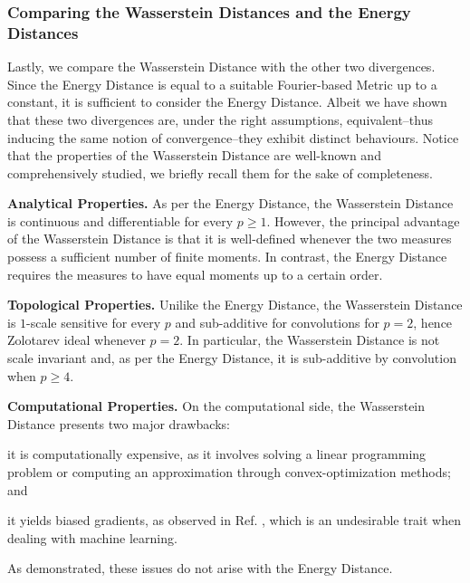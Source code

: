 \documentclass{article}
\renewcommand{\ge}{\geqslant}
\begin{document}


\subsubsection{Comparing the Wasserstein Distances and the Energy Distances}

Lastly, we compare the Wasserstein Distance with the other two divergences.
% 
Since the Energy Distance is equal to a suitable Fourier-based Metric up to a constant, it is sufficient to consider the Energy Distance.
% 
Albeit we have shown that these two divergences are, under the right assumptions, equivalent--thus inducing the same notion of convergence--they exhibit distinct behaviours.
% 
Notice that the properties of the Wasserstein Distance are well-known and comprehensively studied\cite{ambrosio2005gradient,santambrogio2015optimal,villani2009optimal}, we briefly recall them for the sake of completeness.

% 
{\textbf{Analytical Properties.}}
% 
As per the Energy Distance, the Wasserstein Distance is continuous and differentiable for every $p\ge 1$.
% 
However, the principal advantage of the Wasserstein Distance is that it is well-defined whenever the two measures possess a sufficient number of finite moments. 
% 
In contrast, the Energy Distance requires the measures to have equal moments up to a certain order.
% 
% 

% 

% 
{\textbf{Topological Properties.}}
% 
Unilike the Energy Distance, the Wasserstein Distance is $1$-scale sensitive for every $p$ and sub-additive for convolutions for $p=2$, hence Zolotarev ideal whenever $p=2$.\cite{CaTo}
% 
In particular, the Wasserstein Distance is not scale invariant and, as per the Energy Distance, it is sub-additive by convolution when $p\ge 4$.
% 
% 


{\textbf{Computational Properties.}}
On the computational side, the Wasserstein Distance presents two major drawbacks:
\begin{enumerate*}[label=(\roman*)]
    \item it is computationally expensive, as it involves solving a linear programming problem\cite{NIPSABGV,LingOkada2007} or computing an approximation through convex-optimization methods\cite{cuturi2013sinkhorn,AJJR}; and
    \item it yields biased gradients, as observed in Ref. \cite{belle}, which is an undesirable trait when dealing with machine learning.
\end{enumerate*}
% 
As demonstrated, these issues do not arise with the Energy Distance.
\end{document}
